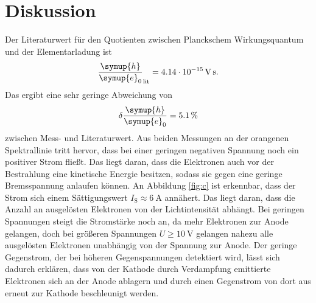 \section{Diskussion}
\label{sec:Diskussion}

Der Literaturwert für den Quotienten zwischen Planckschem Wirkungsquantum und
der Elementarladung ist
\begin{align}
  \frac{\symup{h}}{\symup{e}_0}_\text{lit} =  \SI{4.14e-15}{\volt\second}.
\end{align}
Das ergibt eine sehr geringe Abweichung von
\begin{align}
  \delta \frac{\symup{h}}{\symup{e}_0} = \SI{5.1}{\percent}
\end{align}
zwischen Mess- und Literaturwert.
Aus beiden Messungen an der orangenen Spektrallinie tritt hervor, dass bei
einer geringen negativen Spannung noch ein positiver Strom fließt. Das liegt
daran, dass die Elektronen auch vor der Bestrahlung eine kinetische Energie
besitzen, sodass sie gegen eine geringe Bremsspannung anlaufen können.
An Abbildung \ref{fig:c} ist erkennbar, dass der Strom sich einem
Sättigungswert $I_\text{S} \approx \SI{6}{\ampere}$ annähert.
Das liegt daran, dass die Anzahl an ausgelösten Elektronen von der
Lichtintensität abhängt. Bei geringen Spannungen steigt die Stromstärke noch an,
da mehr Elektronen zur Anode gelangen, doch bei größeren Spannungen
$U \geq \SI{10}{\volt}$ gelangen nahezu alle ausgelösten Elektronen unabhängig
von der Spannung zur Anode. Der geringe Gegenstrom, der bei höheren
Gegenspannungen detektiert wird, lässt sich dadurch erklären, dass von
der Kathode durch Verdampfung emittierte Elektronen sich an der Anode ablagern
und durch einen Gegenstrom von dort aus erneut zur Kathode beschleunigt werden.
